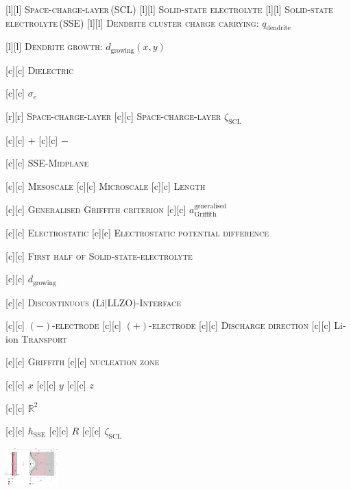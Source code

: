[l][l] {\scriptsize \textsc{Space-charge-layer\,(SCL)}}
[l][l]  {\scriptsize \textsc{Solid-state electrolyte}}
[l][l]  {\scriptsize \textsc{Solid-state electrolyte\,(SSE)}}
[l][l]  {\scriptsize \textsc{Dendrite cluster charge carrying}: $q_{\text{dendrite}}$}

[l][l] {\scriptsize \textsc{Dendrite growth}: $d_{\text{growing}}(x,y)$}

[c][c] {\scriptsize \textsc{Dielectric}}

[c][c] {\scriptsize $\sigma_{e}$}

[r][r]  {\tiny \textsc{Space-charge-layer}}
[c][c]  {\scriptsize \textsc{Space-charge-layer} $\zeta_{\text{SCL}}$}

[c][c]  {\tiny $+$}
[c][c]  {\tiny $-$}

[c][c]  {\tiny \textsc{SSE-Midplane}}

[c][c]  {\scriptsize \textsc{Mesoscale}}
[c][c]  {\scriptsize \textsc{Microscale}}
[c][c]  {\scriptsize \textsc{Length}}

[c][c]  {\tiny \textsc{Generalised Griffith criterion}}
[c][c]   {\tiny $a^{\text{generalised}}_{\text{Griffith}}$}

[c][c]  {\tiny \textsc{Electrostatic}}
[c][c]   {\tiny \textsc{Electrostatic potential difference}}

[c][c]  {\scriptsize \textsc{First half of Solid-state-electrolyte}}

[c][c]  {\tiny $d_{\text{growing}}$}

[c][c] {\scriptsize \textsc{Discontinuous} (Li$|$LLZO)-\textsc{Interface}}

[c][c] {\scriptsize $(-)$-\textsc{electrode}}
[c][c] {\scriptsize $(+)$-\textsc{electrode}}
[c][c] {\scriptsize \textsc{Discharge direction}}
[c][c] {\scriptsize Li-ion \textsc{Transport}}

[c][c]   {\textsc{Griffith}}
[c][c] {\textsc{nucleation zone}}

[c][c] {\scriptsize $x$}
[c][c] {\scriptsize $y$}
[c][c] {\scriptsize $z$}

[c][c] {\scriptsize $\mathbb{R}^{2}$}

[c][c]  {\scriptsize $h_{\text{SSE}}$}
[c][c] {\scriptsize $R$}
[c][c] {\scriptsize $\zeta_{\text{SCL}}$}

\includegraphics[width=0.15\textwidth]{space_charge_layer_Epotential.eps}